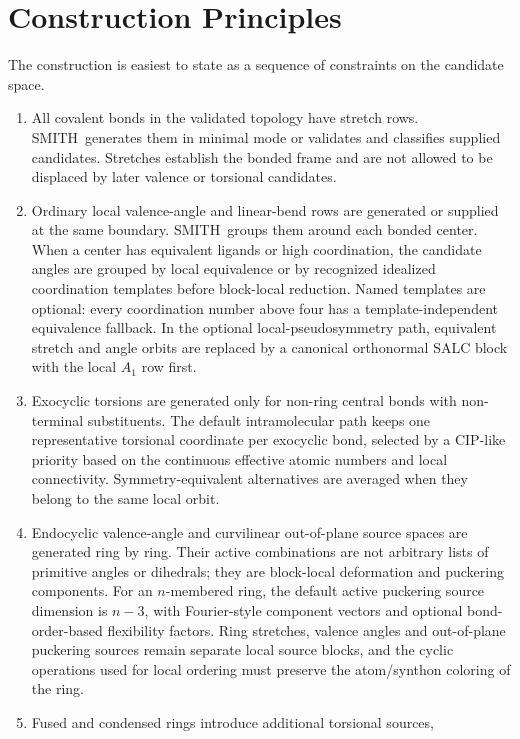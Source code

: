 \documentclass[journal=jctcce,manuscript=article,layout=traditional]{achemso}
\newcommand{\SMITH}{\textsc{SMITH}}
\theoremstyle{definition}
\begin{document}
\section{Construction Principles}

The construction is easiest to state as a sequence of constraints on the
candidate space.

\begin{enumerate}
\item All covalent bonds in the validated topology have stretch rows.
\SMITH\ generates them in minimal mode or validates and classifies supplied candidates.
Stretches establish the bonded frame and are not allowed to be displaced by
later valence or torsional candidates.
\item Ordinary local valence-angle and linear-bend rows are generated or
supplied at the same boundary.  \SMITH\ groups them around each bonded center.
When a center has equivalent ligands or high coordination, the candidate angles
are grouped by local equivalence or by recognized idealized coordination
templates before block-local reduction.  Named templates are optional: every
coordination number above four has a template-independent equivalence fallback.
In the optional local-pseudosymmetry
path, equivalent stretch and angle orbits are replaced by a canonical
orthonormal SALC block with the local \(A_1\) row first.
\item Exocyclic torsions are generated only for non-ring central bonds with
non-terminal substituents.  The default intramolecular path keeps one
representative torsional coordinate per exocyclic bond, selected by a CIP-like
priority based on the continuous effective atomic numbers and local
connectivity.  Symmetry-equivalent alternatives are averaged when they belong
to the same local orbit.
\item Endocyclic valence-angle and curvilinear out-of-plane source spaces are generated ring
by ring.  Their active combinations are not arbitrary lists of primitive
angles or dihedrals; they are block-local deformation and puckering components.
For an \(n\)-membered ring, the default active puckering source dimension is
\(n-3\), with Fourier-style component vectors and optional
bond-order-based flexibility factors.  Ring stretches, valence angles and
out-of-plane puckering sources remain separate local source blocks, and the cyclic operations used
for local ordering must preserve the atom/synthon coloring of the ring.
\item Fused and condensed rings introduce additional torsional sources,

\end{enumerate}
\end{document}
